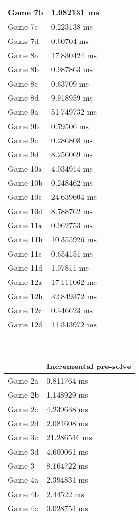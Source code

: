 \begin{multicols}{2}
\begin{tabular}{|l|l|}
	Game 7b & 1.082131 ms \\ \hline
	Game 7c & 0.223138 ms \\ \hline
	Game 7d & 0.60704 ms \\ \hline
	Game 8a & 17.830424 ms \\ \hline
	Game 8b & 0.987863 ms \\ \hline
	Game 8c & 0.63709 ms \\ \hline
	Game 8d & 9.918959 ms \\ \hline
	Game 9a & 51.749732 ms \\ \hline
	Game 9b & 0.79506 ms \\ \hline
	Game 9c & 0.286808 ms \\ \hline
	Game 9d & 8.256069 ms \\ \hline
	Game 10a & 4.034914 ms \\ \hline
	Game 10b & 0.248462 ms \\ \hline
	Game 10c & 24.639604 ms \\ \hline
	Game 10d & 8.788762 ms \\ \hline
	Game 11a & 0.962753 ms \\ \hline
	Game 11b & 10.355926 ms \\ \hline
	Game 11c & 0.654151 ms \\ \hline
	Game 11d & 1.07811 ms \\ \hline
	Game 12a & 17.111062 ms \\ \hline
	Game 12b & 32.849372 ms \\ \hline
	Game 12c & 0.346623 ms \\ \hline
	Game 12d & 11.343972 ms \\ \hline
\end{tabular}\\
\begin{tabular}{|l|l|}
	\hline
	& Incremental pre-solve \\ \hline
	Game 2a & 0.811764 ms \\ \hline
	Game 2b & 1.148929 ms \\ \hline
	Game 2c & 4.239638 ms \\ \hline
	Game 2d & 2.081608 ms \\ \hline
	Game 3c & 21.286546 ms \\ \hline
	Game 3d & 4.600061 ms \\ \hline
	Game 3 & 8.164722 ms \\ \hline
	Game 4a & 2.394831 ms \\ \hline
	Game 4b & 2.44522 ms \\ \hline
	Game 4c & 0.028754 ms \\ \hline

\end{tabular}
\end{multicols}

